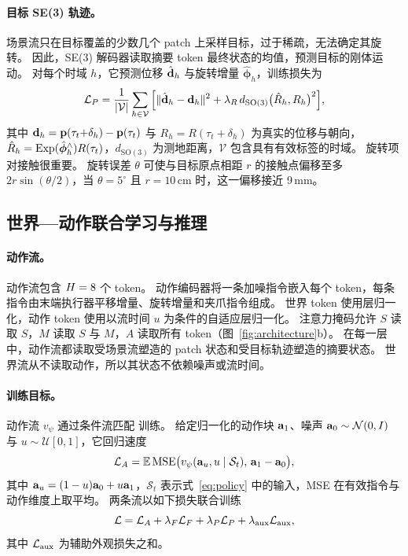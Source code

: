 \paragraph{目标 SE(3) 轨迹。}
场景流只在目标覆盖的少数几个 patch 上采样目标，过于稀疏，无法确定其旋转。
因此，SE(3) 解码器读取摘要 token 最终状态的均值，预测目标的刚体运动。
对每个时域 $h$，它预测位移 $\hat{\mathbf{d}}_h$ 与旋转增量 $\hat{\boldsymbol\phi}_h$，训练损失为
\begin{equation}
\mathcal L_P=\frac1{|\mathcal V|}\sum_{h\in\mathcal V}\Big[\|\hat{\mathbf{d}}_h-\mathbf{d}_h\|^2
+\lambda_R\,d_{\mathrm{SO}(3)}\big(\hat R_h,R_h\big)^2\Big],
\label{eq:poseloss}
\end{equation}
其中 $\mathbf{d}_h=\mathbf{p}(\tau_t{+}\delta_h)-\mathbf{p}(\tau_t)$ 与 $R_h=R(\tau_t{+}\delta_h)$ 为真实的位移与朝向，$\hat R_h=\operatorname{Exp}(\hat{\boldsymbol\phi}_h^\wedge)R(\tau_t)$，$d_{\mathrm{SO}(3)}$ 为测地距离，$\mathcal V$ 包含具有有效标签的时域。
旋转项对接触很重要。
旋转误差 $\theta$ 可使与目标原点相距 $r$ 的接触点偏移至多 $2r\sin(\theta/2)$，当 $\theta=5^\circ$ 且 $r=10$\,cm 时，这一偏移接近 9\,mm。

\subsection{世界—动作联合学习与推理}
\label{sec:act}

\paragraph{动作流。}
动作流包含 $H=8$ 个 token。
动作编码器将一条加噪指令嵌入每个 token，每条指令由末端执行器平移增量、旋转增量和夹爪指令组成。
世界 token 使用层归一化，动作 token 使用以流时间 $u$ 为条件的自适应层归一化。
注意力掩码允许 $S$ 读取 $S$，$M$ 读取 $S$ 与 $M$，$A$ 读取所有 token（图~\ref{fig:architecture}b）。
在每一层中，动作流都读取受场景流塑造的 patch 状态和受目标轨迹塑造的摘要状态。
世界流从不读取动作，所以其状态不依赖噪声或流时间。

\paragraph{训练目标。}
动作流 $v_\psi$ 通过条件流匹配 \cite{flowmatching} 训练。
给定归一化的动作块 $\mathbf{a}_1$、噪声 $\mathbf{a}_0\sim\mathcal N(0,I)$ 与 $u\sim\mathcal U[0,1]$，它回归速度
\begin{equation}
\mathcal L_A=\mathbb E\,\mathrm{MSE}\big(v_\psi(\mathbf{a}_u,u\mid\mathcal S_t),\,\mathbf{a}_1-\mathbf{a}_0\big),
\label{eq:fm}
\end{equation}
其中 $\mathbf{a}_u=(1-u)\mathbf{a}_0+u\mathbf{a}_1$，$\mathcal S_t$ 表示式~\eqref{eq:policy} 中的输入，MSE 在有效指令与动作维度上取平均。
两条流以如下损失联合训练
\begin{equation}
\mathcal L=\mathcal L_A+\lambda_F\mathcal L_F+\lambda_P\mathcal L_P+\lambda_{\rm aux}\mathcal L_{\rm aux},
\label{eq:total}
\end{equation}
其中 $\mathcal L_{\rm aux}$ 为辅助外观损失之和。

